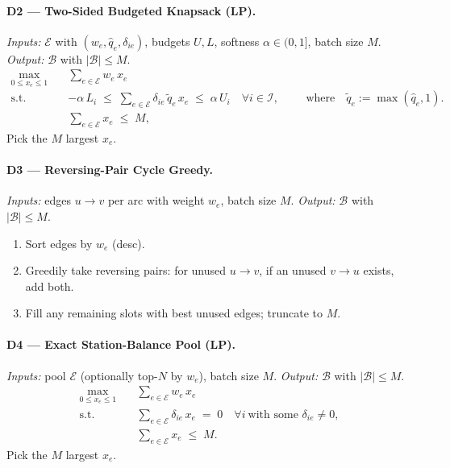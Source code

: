 \documentclass[11pt,a4paper]{article}
\begin{document}
\paragraph{D2 — Two-Sided Budgeted Knapsack (LP).}
\emph{Inputs:} $\mathcal{E}$ with $(w_e,\widehat q_e,\delta_{ie})$, budgets $U,L$, softness $\alpha\in(0,1]$, batch size $M$.
\emph{Output:} $\mathcal{B}$ with $|\mathcal{B}|\le M$.
\[
\begin{aligned}
\max_{0\le x_e\le 1}\quad & \sum_{e\in\mathcal{E}} w_e\,x_e \\
\text{s.t.}\quad
& -\alpha\,L_i \;\le\; \sum_{e\in\mathcal{E}} \delta_{ie}\,\widetilde q_e\,x_e \;\le\; \alpha\,U_i
\quad \forall i\in\mathcal{I},\\
& \sum_{e\in\mathcal{E}} x_e \;\le\; M,
\end{aligned}
\qquad\text{where}\quad
\widetilde q_e:=\max(\widehat q_e,1).
\]
Pick the $M$ largest $x_e$.

\paragraph{D3 — Reversing-Pair Cycle Greedy.}
\emph{Inputs:} edges $u\to v$ per arc with weight $w_e$, batch size $M$.
\emph{Output:} $\mathcal{B}$ with $|\mathcal{B}|\le M$.
\begin{enumerate}
\item Sort edges by $w_e$ (desc).
\item Greedily take reversing pairs: for unused $u\to v$, if an unused $v\to u$ exists, add both.
\item Fill any remaining slots with best unused edges; truncate to $M$.
\end{enumerate}

\paragraph{D4 — Exact Station-Balance Pool (LP).}
\emph{Inputs:} pool $\mathcal{E}$ (optionally top-$N$ by $w_e$), batch size $M$.
\emph{Output:} $\mathcal{B}$ with $|\mathcal{B}|\le M$.
\[
\begin{aligned}
\max_{0\le x_e\le 1}\quad & \sum_{e\in\mathcal{E}} w_e\,x_e \\
\text{s.t.}\quad
& \sum_{e\in\mathcal{E}} \delta_{ie}\,x_e \;=\;0 \quad \forall i\ \text{with some }\delta_{ie}\ne 0,\\
& \sum_{e\in\mathcal{E}} x_e \;\le\; M.
\end{aligned}
\]
Pick the $M$ largest $x_e$.
\end{document}
